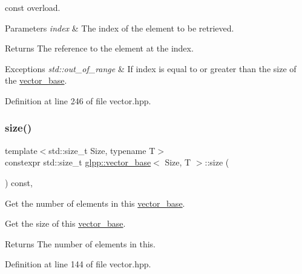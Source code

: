 {\ttfamily const} overload. 


\begin{DoxyParams}{Parameters}
{\em index} & The index of the element to be retrieved. \\
\hline
\end{DoxyParams}
\begin{DoxyReturn}{Returns}
The reference to the element at the {\ttfamily index}. 
\end{DoxyReturn}

\begin{DoxyExceptions}{Exceptions}
{\em std\+::out\+\_\+of\+\_\+range} & If {\ttfamily index} is equal to or greater than the size of the \hyperlink{classglpp_1_1vector__base}{vector\+\_\+base}. \\
\hline
\end{DoxyExceptions}


Definition at line 246 of file vector.\+hpp.

\mbox{\label{classglpp_1_1vector__base_a51861a7d1ee8e050e60d804b1fdfa4b8}} 
\subsubsection{\texorpdfstring{size()}{size()}}
{\footnotesize\ttfamily template$<$std\+::size\+\_\+t Size, typename T$>$ \\
constexpr std\+::size\+\_\+t \hyperlink{classglpp_1_1vector__base}{glpp\+::vector\+\_\+base}$<$ Size, T $>$\+::size (\begin{DoxyParamCaption}{ }\end{DoxyParamCaption}) const\hspace{0.3cm}{\ttfamily [inline]}, {\ttfamily [noexcept]}}



Get the number of elements in this \hyperlink{classglpp_1_1vector__base}{vector\+\_\+base}. 

Get the size of this \hyperlink{classglpp_1_1vector__base}{vector\+\_\+base}.

\begin{DoxyReturn}{Returns}
The number of elements in this. 
\end{DoxyReturn}


Definition at line 144 of file vector.\+hpp.



